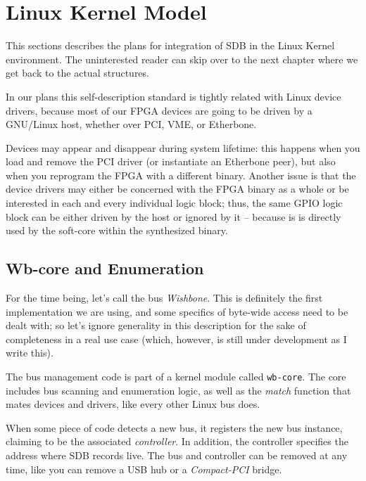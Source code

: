 \documentclass[a4paper, 12pt]{article}
\begin{document}
\footnotesize

\normalsize

\section{Linux Kernel Model}

This sections describes the plans for integration of SDB in the Linux
Kernel environment.  The uninterested reader can skip over to the next
chapter where we get back to the actual structures.

In our plans this self-description standard is tightly related with
Linux device drivers, because most of our FPGA devices are going to be
driven by a GNU/Linux host, whether over PCI, VME, or Etherbone.

Devices may appear and disappear during system lifetime: this happens
when you load and remove the PCI driver (or instantiate an Etherbone
peer), but also when you reprogram the FPGA with a different binary.
Another issue is that the device drivers may either be concerned with the FPGA
binary as a whole or be interested in each and every  individual logic block;
thus, the same
GPIO logic block can be either driven by the host or ignored by it -- because
is is directly used by the soft-core within the synthesized binary.

\subsection{Wb-core and Enumeration}

For the time being, let's call the bus \textit{Wishbone}. This is
definitely the first implementation we are using, and some specifics
of byte-wide access need to be dealt with; so let's ignore
generality in this description for the sake of completeness in a
real use case (which, however, is still under development as I write this).

The bus management code is part of a kernel module called
\texttt{wb-core}. The core includes bus scanning and enumeration
logic, as well as the \textit{match} function that mates devices and
drivers, like every other Linux bus does.

When some piece of code detects a new bus, it registers the new
bus instance, claiming to be the associated \textit{controller}.  In addition,
the controller specifies the address where SDB records live.  The bus and
controller can be removed at any time, like you can remove a USB hub
or a \textit{Compact-PCI} bridge.
\end{document}
